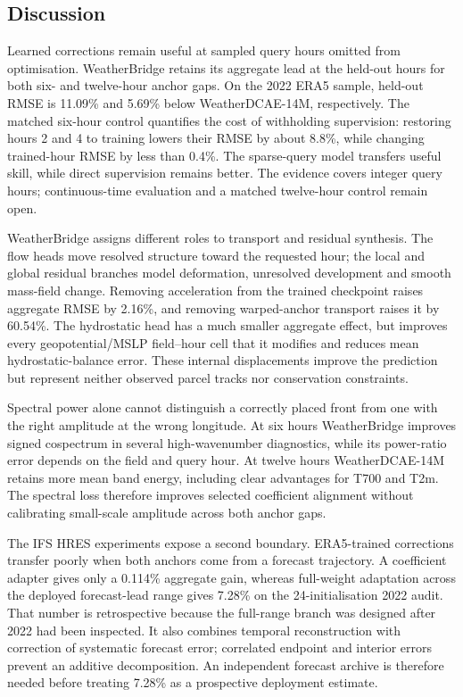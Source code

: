 \documentclass[referee,lineno,pdflatex,sn-nature]{sn-jnl}
\begin{document}
\begin{deferreddiscussion}
\section{Discussion}
\label{sec:discussion}

Learned corrections remain useful at sampled query hours omitted from
optimisation. WeatherBridge retains its aggregate lead at the held-out hours
for both six- and twelve-hour anchor gaps. On the 2022 ERA5 sample,
held-out RMSE is 11.09\% and 5.69\% below WeatherDCAE-14M, respectively.
The matched six-hour control quantifies the cost of withholding supervision:
restoring hours 2 and 4 to training lowers their RMSE by about 8.8\%, while
changing trained-hour RMSE by less than 0.4\%. The sparse-query model transfers
useful skill, while direct supervision remains better. The evidence covers
integer query hours; continuous-time evaluation and a matched twelve-hour
control remain open.

WeatherBridge assigns different roles to transport and residual synthesis.
The flow heads move resolved structure toward the requested hour; the local
and global residual branches model deformation, unresolved development and
smooth mass-field change. Removing acceleration from the trained checkpoint
raises aggregate RMSE by 2.16\%, and removing warped-anchor transport raises
it by 60.54\%. The hydrostatic head has a much smaller aggregate effect, but
improves every geopotential/MSLP field--hour cell that it modifies and reduces
mean hydrostatic-balance error. These internal displacements improve the
prediction but represent neither observed parcel tracks nor conservation
constraints.

Spectral power alone cannot distinguish a correctly placed front from one
with the right amplitude at the wrong longitude. At six hours WeatherBridge
improves signed cospectrum in several high-wavenumber diagnostics, while its
power-ratio error depends on the field and query hour. At twelve hours
WeatherDCAE-14M retains more mean band energy, including clear advantages for
T700 and T2m. The spectral loss therefore improves selected coefficient
alignment without calibrating small-scale amplitude across both anchor gaps.

The IFS HRES experiments expose a second boundary. ERA5-trained corrections
transfer poorly when both anchors come from a forecast trajectory. A
coefficient adapter gives only a 0.114\% aggregate gain, whereas full-weight
adaptation across the deployed forecast-lead range gives 7.28\% on the
24-initialisation 2022 audit. That number is retrospective because the
full-range branch was designed after 2022 had been inspected. It also combines
temporal reconstruction with correction of systematic forecast error;
correlated endpoint and interior errors prevent an additive decomposition. An
independent forecast archive is therefore needed before treating 7.28\% as a
prospective deployment estimate.


\end{deferreddiscussion}
\end{document}
